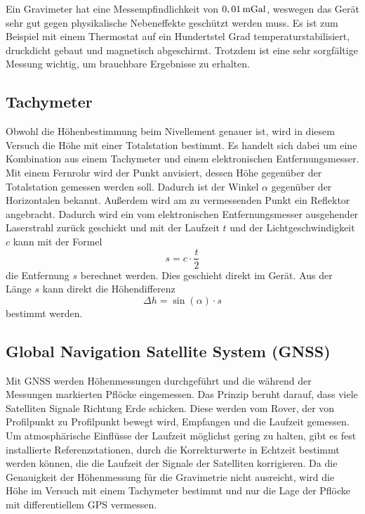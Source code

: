 Ein Gravimeter hat eine Messempfindlichkeit von $0,01\,\mathrm{mGal}$, weswegen das Gerät sehr gut gegen physikalische Nebeneffekte geschützt werden muss. Es ist zum Beispiel mit einem Thermostat auf ein Hundertstel Grad temperaturstabilisiert, druckdicht gebaut und magnetisch abgeschirmt. Trotzdem ist eine sehr sorgfältige Messung wichtig, um brauchbare Ergebnisse zu erhalten. 

\subsection{Tachymeter}

Obwohl die Höhenbestimmung beim Nivellement genauer ist, wird in diesem Versuch die Höhe mit einer Totalstation bestimmt. Es handelt sich dabei um eine Kombination aus einem Tachymeter und einem elektronischen Entfernungsmesser. Mit einem Fernrohr wird der Punkt anvisiert, dessen Höhe gegenüber der Totalstation gemessen werden soll. Dadurch ist der Winkel $\alpha$ gegenüber der Horizontalen bekannt. Außerdem wird am zu vermessenden Punkt ein Reflektor angebracht. Dadurch wird ein vom elektronischen Entfernungsmesser ausgehender Laserstrahl zurück geschickt und mit der Laufzeit $t$ und der Lichtgeschwindigkeit $c$ kann mit der Formel
\begin{equation}
 s=c\cdot \frac{t}{2}
\end{equation}
die Entfernung $s$ berechnet werden. Dies geschieht direkt im Gerät. Aus der Länge $s$ kann direkt die Höhendifferenz
\begin{equation}
 \Delta h=\sin(\alpha)\cdot s
\end{equation}
bestimmt werden. 

\subsection{Global Navigation Satellite System (GNSS)}

Mit GNSS werden Höhenmessungen durchgeführt und die während der Messungen markierten Pflöcke eingemessen. Das Prinzip beruht darauf, dass viele Satelliten Signale Richtung Erde schicken. Diese werden vom Rover, der von Profilpunkt zu Profilpunkt bewegt wird, Empfangen und die Laufzeit gemessen. Um atmosphärische Einflüsse der Laufzeit möglichst gering zu halten, gibt es fest installierte Referenzstationen, durch die Korrekturwerte in Echtzeit bestimmt werden können, die die Laufzeit der Signale der Satelliten korrigieren. 
Da die Genauigkeit der Höhenmessung für die Gravimetrie nicht ausreicht, wird die Höhe im Versuch mit einem Tachymeter bestimmt und nur die Lage der Pflöcke mit differentiellem GPS vermessen. 
